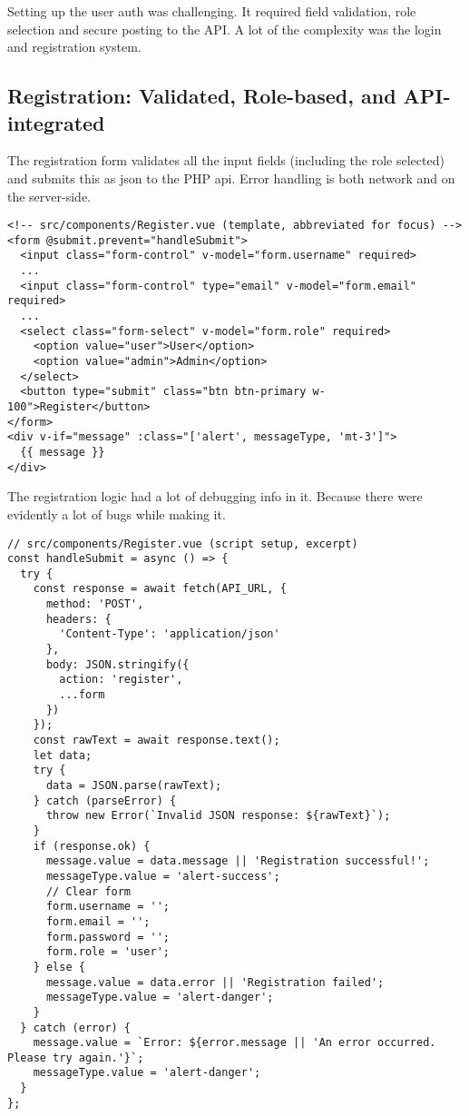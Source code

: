 \documentclass[11pt,a4paper]{article}
\begin{document}
Setting up the user auth was challenging. It required field validation, role selection and secure posting to the API. A lot of the complexity was the login and registration system.

\subsection*{Registration: Validated, Role-based, and API-integrated}

The registration form validates all the input fields (including the role selected) and submits this as json to the PHP api. Error handling is both network and on the server-side.

\begin{verbatim}
<!-- src/components/Register.vue (template, abbreviated for focus) -->
<form @submit.prevent="handleSubmit">
  <input class="form-control" v-model="form.username" required>
  ...
  <input class="form-control" type="email" v-model="form.email" required>
  ...
  <select class="form-select" v-model="form.role" required>
    <option value="user">User</option>
    <option value="admin">Admin</option>
  </select>
  <button type="submit" class="btn btn-primary w-100">Register</button>
</form>
<div v-if="message" :class="['alert', messageType, 'mt-3']">
  {{ message }}
</div>
\end{verbatim}

The registration logic had a lot of debugging info in it. Because there were evidently a lot of bugs while making it.

\begin{verbatim}
// src/components/Register.vue (script setup, excerpt)
const handleSubmit = async () => {
  try {
    const response = await fetch(API_URL, {
      method: 'POST',
      headers: {
        'Content-Type': 'application/json'
      },
      body: JSON.stringify({
        action: 'register',
        ...form
      })
    });
    const rawText = await response.text();
    let data;
    try {
      data = JSON.parse(rawText);
    } catch (parseError) {
      throw new Error(`Invalid JSON response: ${rawText}`);
    }
    if (response.ok) {
      message.value = data.message || 'Registration successful!';
      messageType.value = 'alert-success';
      // Clear form
      form.username = '';
      form.email = '';
      form.password = '';
      form.role = 'user';
    } else {
      message.value = data.error || 'Registration failed';
      messageType.value = 'alert-danger';
    }
  } catch (error) {
    message.value = `Error: ${error.message || 'An error occurred. Please try again.'}`;
    messageType.value = 'alert-danger';
  }
};
\end{verbatim}
\end{document}
